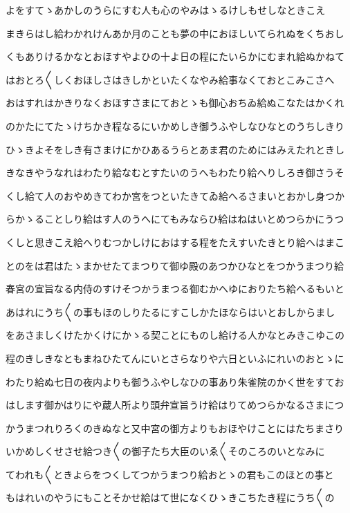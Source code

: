 \documentclass[a4paper,11pt,landscape]{ltjtarticle}
\begin{document}
よをすてゝあかしのうらにすむ人も心のやみはゝるけしもせしなときこえ
\par\medskip
まきらはし給わかれけんあか月のことも夢の中におほしいてられぬをくちおし
\par\medskip
くもありけるかなとおほすやよひの十よ日の程にたいらかにむまれ給ぬかねて
\par\medskip
はおとろ〱しくおほしさはきしかといたくなやみ給事なくておとこみこさへ
\par\medskip
おはすれはかきりなくおほすさまにておとゝも御心おちゐ給ぬこなたはかくれ
\par\medskip
のかたにてたゝけちかき程なるにいかめしき御うふやしなひなとのうちしきり
\par\medskip
ひゝきよそをしき有さまけにかひあるうらとあま君のためにはみえたれときし
\par\medskip
きなきやうなれはわたり給なむとすたいのうへもわたり給へりしろき御さうそ
\par\medskip
くし給て人のおやめきてわか宮をつといたきてゐ給へるさまいとおかし身つか
\par\medskip
らかゝることしり給はす人のうへにてもみならひ給はねはいとめつらかにうつ
\par\medskip
くしと思きこえ給へりむつかしけにおはする程をたえすいたきとり給へはまこ
\par\medskip
とのをは君はたゝまかせたてまつりて御ゆ殿のあつかひなとをつかうまつり給
\par\medskip
春宮の宣旨なる内侍のすけそつかうまつる御むかへゆにおりたち給へるもいと
\par\medskip
あはれにうち〱の事もほのしりたるにすこしかたほならはいとおしからまし
\par\medskip
をあさましくけたかくけにかゝる契ことにものし給ける人かなとみきこゆこの
\par\medskip
程のきしきなともまねひたてんにいとさらなりや六日といふにれいのおとゝに
\par\medskip
わたり給ぬ七日の夜内よりも御うふやしなひの事あり朱雀院のかく世をすてお
\par\medskip
はします御かはりにや蔵人所より頭弁宣旨うけ給はりてめつらかなるさまにつ
\par\medskip
かうまつれりろくのきぬなと又中宮の御方よりもおほやけことにはたちまさり
\par\medskip
いかめしくせさせ給つき〱の御子たち大臣のいゑ〱そのころのいとなみに
\par\medskip
てわれも〱ときよらをつくしてつかうまつり給おとゝの君もこのほとの事と
\par\medskip
もはれいのやうにもことそかせ給はて世になくひゝきこちたき程にうち〱の
\end{document}
